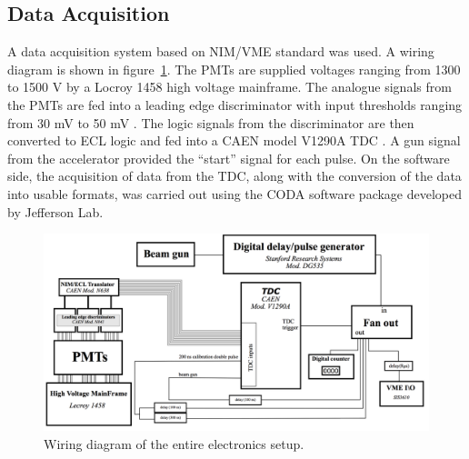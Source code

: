 \subsection{Data Acquisition}
A data acquisition system based on NIM/VME standard was used.
A wiring diagram is shown in figure~\ref{fig:WiringDiagram}.
The PMTs are supplied voltages ranging from 1300 to 1500 V by a Locroy 1458 high voltage mainframe.
The analogue signals from the PMTs are fed into a leading edge discriminator with input thresholds ranging from 30 mV to 50 mV .
The logic signals from the discriminator are then converted to ECL logic and fed into a CAEN model V1290A TDC .
A gun signal from the accelerator provided the “start” signal for each pulse.
On the software side, the acquisition of data from the TDC, along with the conversion of the data into usable formats, was carried out using the CODA software package developed by Jefferson Lab.
\begin{figure}[h]
\includegraphics[width=\textwidth]{Content/Methods/WiringDiagram.png}
\caption{Wiring diagram of the entire electronics setup. }
\label{fig:WiringDiagram}
\end{figure}